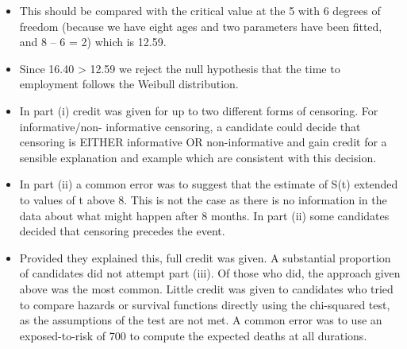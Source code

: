 \documentclass[a4paper,12pt]{article}
\begin{document}
\begin{itemize}
\item This should be compared with the critical value at the 5%
with 6 degrees of freedom (because we have eight ages and two parameters
have been fitted, and 8 – 6 = 2)
which is 12.59.
\item Since 16.40 > 12.59
we reject the null hypothesis that the time to employment follows the Weibull distribution.
\item In part (i) credit was given for up to two different forms of censoring. For informative/non- informative censoring, a candidate could decide that censoring is EITHER informative OR non-informative and gain credit for a sensible explanation and example which are consistent with this decision. 
\item In part (ii) a common error was to suggest that the estimate of S(t) extended to values of t above 8. This is not the case as there is no information in the data about what might happen after 8 months. In part (ii) some candidates decided that censoring precedes the event. \item Provided they explained this, full credit was given. A substantial proportion of candidates did not attempt part (iii). Of those who did, the approach given above was the most common. Little credit was given to candidates who tried to compare hazards or survival functions directly using the chi-squared test, as the
assumptions of the test are not met. A common error was to use an exposed-to-risk of 700 to compute the expected deaths at all durations.
\end{itemize}
\end{document}
